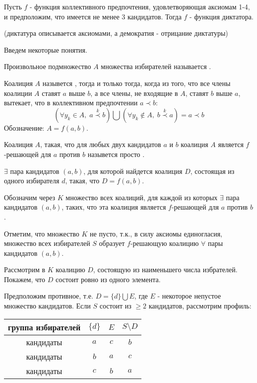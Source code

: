 \begin{theorem}\label{cha:5/the:1}
	Пусть $f$ - функция коллективного предпочтения, удовлетворяющая аксиомам 1-4, и предположим, что имеется не менее 3 кандидатов. Тогда $f$ - функция диктатора.

	(диктатура описывается аксиомами, а демократия - отрицание диктатуры)
\end{theorem}
\begin{Proof}
	Введем некоторые понятия.

	Произвольное подмножество $A$ множества избирателей называется .

	\begin{definition}\label{cha:5/def:1}
		Коалиция $A$ назывется , тогда и только тогда, когда из того, что все члены коалиции $A$ ставят $a$ выше $b$, а все члены, не входящие в $A$, ставят $b$ выше $a$, вытекает, что в коллективном предпочтении $a \prec b$:
		$$(\forall y_k \in A, \; a \overset{k}{\prec} b) \bigcup (\forall y_k \not \in A, \; b \overset{k}{\prec}a) = a \prec b$$
		Обозначение: $A = f(a, b)$.
	\end{definition}

	Коалиция $A$, такая, что для любых двух кандидатов $a$ и $b$ коалиция $A$ является $f$-решающей для $a$ против $b$ назывется просто .

	\begin{lemma}[]\label{cha:5/lemma:1}
		$\exists$ пара кандидатов $(a, b)$, для которой найдется коалиция $D$, состоящая из одного избирателя $d$, такая, что $D = f(a, b)$.
	\end{lemma}
	\begin{Proof}
		Обозначим через $K$ множество всех коалиций, для каждой из которых $\exists$ пара кандидатов $(a, b)$, таких, что эта коалиция является $f$-решающей для $a$ против $b$. 

		Отметим, что множество $K$ не пусто, т.к., в силу аксиомы единогласия, множество всех избирателей $S$ образует $f$-решающую коалицию $\forall$ пары кандидатов $(a, b)$.

		Рассмотрим в $K$ коалицию $D$, состоящую из наименьшего числа избрателей. Покажем, что $D$ состоит ровно из одного элемента.

		Предположим противное, т.е. $D = \{d\} \bigcup E$, где $E$ - некоторое непустое множество кандидатов. Если $S$ состоит из $\ge 2$ кандидатов, рассмотрим профиль:

		\begin{center}
			\begin{tabular}{ | c | c | c | c |}
				\hline
					группа избирателей & $\{d\}$ & $E$ & $S \setminus D$ \\ \hline
					кандидаты & $a$ & $c$ & $b$ \\
					кандидаты & $b$ & $a$ & $c$ \\
					кандидаты & $c$ & $b$ & $a$ \\
				\hline
			\end{tabular}
		\end{center}


\end{Proof}
\end{Proof}
